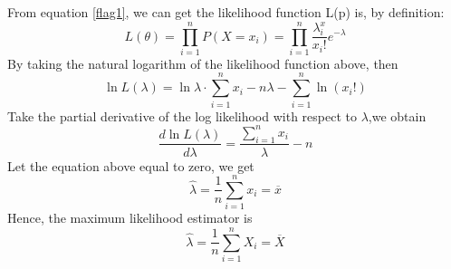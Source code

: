 \documentclass{mcmthesis}
\begin{document}
		From equation \eqref{flag1}, we can get the likelihood function L(p) is, by definition:
			\begin{equation}
				L(\theta) = \prod_{i=1}^{n}P(X=x_i) = \prod_{i=1}^{n} {\frac{{\lambda}^x_i}{x_i!}}e^{-\lambda}
			\end{equation}
		By taking  the natural logarithm of the likelihood function above, then
			$${\ln L(\lambda) = \ln {\lambda} \cdot \sum_{i=1}^{n}x_i-n\lambda- \sum_{i=1}^{n}\ln (x_i!)}$$
		Take the partial derivative of the log likelihood with respect to ${\lambda}$,we obtain
			$${\frac {d \ln L(\lambda)}{d \lambda} = \frac {\sum\limits_{i=1}^{n}x_i}{\lambda} -n}$$
		Let the equation above equal to zero, we get
			\begin{equation}
				\hat \lambda = \frac{1}{n} \sum_{i=1}^{n}x_i = \overline x
 			\end{equation}
		Hence, the  maximum likelihood estimator is
			\begin{equation}
				\hat \lambda = \frac{1}{n} \sum_{i=1}^{n}X_i = \overline X
			\end{equation}
\end{document}
